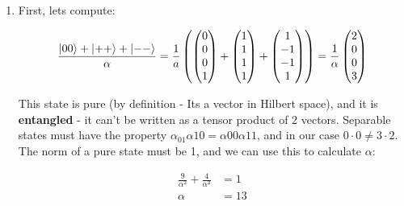 \documentclass[a4paper,10pt]{hw}
\DeclarePairedDelimiter\ket{\lvert}{\rangle}
\begin{document}
\begin{enumerate}

\item

First, lets compute:

$$
\frac{\ket{00} + \ket{++} + \ket{--}}{\alpha} = \frac{1}{a}
\left( 
\begin{pmatrix}
0 \\ 0 \\ 0 \\ 1
\end{pmatrix}
+
\begin{pmatrix}
1 \\ 1 \\ 1 \\ 1
\end{pmatrix}
+
\begin{pmatrix}
1 \\ -1 \\ -1 \\ 1
\end{pmatrix}
\right)
=
\frac{1}{\alpha}
\begin{pmatrix}
2 \\ 0 \\ 0 \\ 3
\end{pmatrix}
$$

This state is pure (by definition - Its a vector in Hilbert space), and it is \textbf{entangled} - it can't be written as a tensor product of 2 vectors. Separable states must have the property $\alpha_{01}\alpha{10}=\alpha{00}\alpha{11}$, and in our case $0\cdot 0 \neq 3\cdot 2$.
The norm of a pure state must be 1, and we can use this to calculate $\alpha$:

\begin{align*}
\frac{9}{\alpha^2} + \frac{4}{\alpha^2} &= 1 \\
\alpha &= 13
\end{align*}



\end{enumerate}
\end{document}
